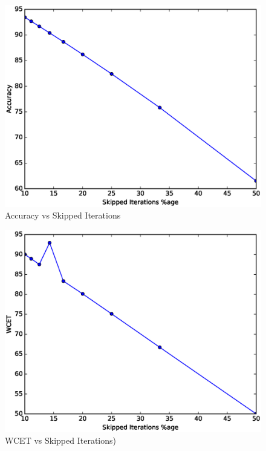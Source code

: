\begin{figure}
  \includegraphics[width=0.95\linewidth]{Results/bubblesort1.eps}
  \caption{Accuracy vs Skipped Iterations}
  \label{bubblesort1}
\end{figure}

\begin{figure}
  \includegraphics[width=0.95\linewidth]{Results/bubblesort2.eps}
  \caption{WCET vs Skipped Iterations)}
  \label{bubblesort2}
\end{figure}


